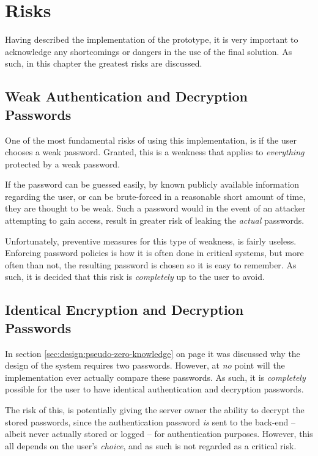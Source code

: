 \chapter{Risks}
	Having described the implementation of the prototype, it is very important to acknowledge any shortcomings or dangers in the use of the final solution. As such, in this chapter the greatest risks are discussed.
	

	\section{Weak Authentication and Decryption Passwords}
		One of the most fundamental risks of using this implementation, is if the user chooses a weak password. Granted, this is a weakness that applies to \emph{everything} protected by a weak password.

		If the password can be guessed easily, by known publicly available information regarding the user, or can be brute-forced in a reasonable short amount of time, they are thought to be weak. Such a password would in the event of an attacker attempting to gain access, result in greater risk of leaking the \emph{actual} passwords.

		Unfortunately, preventive measures for this type of weakness, is fairly useless. Enforcing password policies is how it is often done in critical systems, but more often than not, the resulting password is chosen so it is easy to remember. As such, it is decided that this risk is \emph{completely} up to the user to avoid.

	\section{Identical Encryption and Decryption Passwords}
		In section \ref{sec:design:pseudo-zero-knowledge} on page \pageref{sec:design:pseudo-zero-knowledge} it was discussed why the design of the system requires two passwords. However, at \emph{no} point will the implementation ever actually compare these passwords. As such, it is \emph{completely} possible for the user to have identical authentication and decryption passwords.

		The risk of this, is potentially giving the server owner the ability to decrypt the stored passwords, since the authentication password \emph{is} sent to the back-end -- albeit never actually stored or logged -- for authentication purposes. However, this all depends on the user's \emph{choice}, and as such is not regarded as a critical risk.
	
